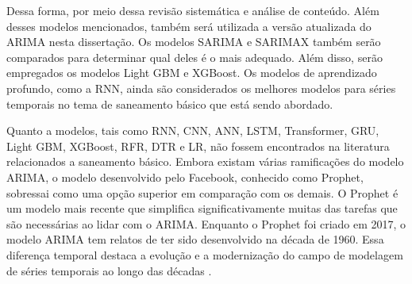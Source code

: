 Dessa forma, por meio dessa revisão sistemática e análise de conteúdo.
Além desses modelos mencionados, também será utilizada a versão atualizada do ARIMA nesta dissertação. Os modelos SARIMA e SARIMAX também serão comparados para determinar qual deles é o mais adequado. Além disso, serão empregados os modelos Light GBM e XGBoost. Os modelos de aprendizado profundo, como a RNN, ainda são considerados os melhores modelos para séries temporais no tema de saneamento básico que está sendo abordado.

Quanto a modelos, tais como RNN, CNN, ANN, LSTM, Transformer, GRU, Light GBM, XGBoost, RFR, DTR e LR, não fossem encontrados na literatura relacionados a  saneamento básico. 
Embora existam várias ramificações do modelo ARIMA, o modelo desenvolvido pelo Facebook, conhecido como Prophet, sobressai como uma opção superior em comparação com os demais. O Prophet é um modelo mais recente que simplifica significativamente muitas das tarefas que são necessárias ao lidar com o ARIMA. Enquanto o Prophet foi criado em 2017, o modelo ARIMA tem relatos de ter sido desenvolvido na década de 1960. Essa diferença temporal destaca a evolução e a modernização do campo de modelagem de séries temporais ao longo das décadas \cite{ramos2010previsoes}.











